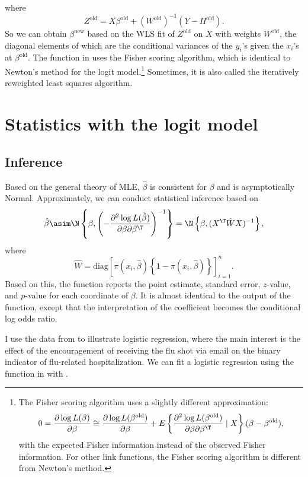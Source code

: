 where
\[
Z^{\text{old}}=X\beta^{\text{old}}+(W^{\text{old}})^{-1}(Y-\Pi^{\text{old}}).
\]
So we can obtain $\beta^{\text{new}}$ based on the WLS
fit of $Z^{\text{old}}$ on $X$ with weights $W^{\text{old}}$, the diagonal elements of which
are the conditional variances of the $y_{i}$'s given the $x_{i}$'s at $\beta^{\text{old}}$.
The  function in  uses the Fisher scoring algorithm, which is
identical to Newton's method for the logit model.\footnote{The Fisher scoring algorithm uses a slightly different approximation:
$$
0=\frac{\partial\log L( \beta )}{\partial\beta}\cong\frac{\partial\log L(\beta^{\text{old}})}{\partial\beta}
+  E\left\{ \frac{\partial^{2}\log L(\beta^{\text{old}})}{\partial\beta\partial\beta^{\T}}  \mid X \right\} (\beta-\beta^{\text{old}}) ,
$$ 
with the expected Fisher information instead of the observed Fisher information. For other link functions, the Fisher scoring algorithm is different from Newton's method. 
} Sometimes, it is
also called the iteratively reweighted least squares algorithm. 



\section{Statistics with the logit model}





\subsection{Inference}

Based on the general theory of MLE, $\hat{\beta}$ is consistent for
$\beta$ and is asymptotically Normal. Approximately, we can conduct
statistical inference based on
\[
\hat{\beta}\asim \N\left\{ \beta,\left(-\frac{\partial^{2}\log L(\hat{\beta})}{\partial\beta\partial\beta^{\T}}\right)^{-1}\right\} 
=\N\left\{ \beta, (X^{\T}\hat{W}X)^{-1} \right\},
\]
where 
\[
\hat{W}=\text{diag}\left[\pi(x_{i},\hat{\beta})\left\{ 1-\pi(x_{i},\hat{\beta} )\right\} \right]_{i=1}^{n}.
\]
Based on this, the  function reports the point estimate, standard error, $z$-value, and $p$-value for each coordinate of $\beta$. It is almost identical to the output of the  function, except that the interpretation of the coefficient becomes the conditional log odds ratio. 



I use the data from \citet{hirano2000assessing} to illustrate logistic regression, where the main interest is the effect of the encouragement of receiving the flu shot via email on the binary indicator of flu-related hospitalization. We can fit a logistic regression using the  function in  with . 

